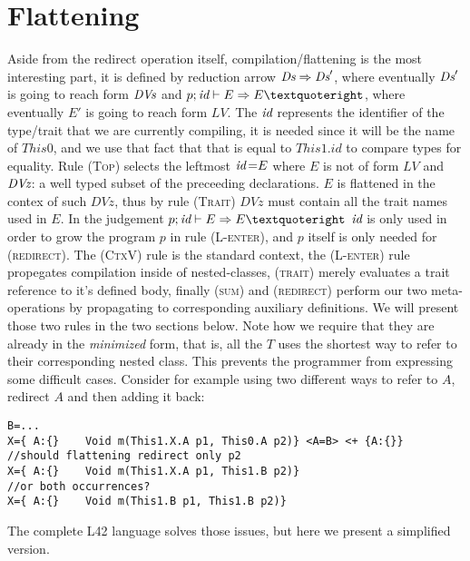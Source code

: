 \section{Flattening}

Aside from the redirect operation itself, compilation/flattening is the most interesting part,
it is defined by reduction arrow $\textit{Ds} \Rightarrow \textit{Ds}'$, where eventually $\textit{Ds}'$ is going to reach form $\textit{DVs}$  and $p; \id \vdash E \Rightarrow E’$, where eventually $E'$ is going to reach form $LV$. The $\textit{id}$ represents the identifier of the type/trait that we are currently compiling, it is needed since it will be the name of $This0$, and we use that fact that that is equal to $This1.id$ to compare types for equality.
Rule \textsc{(Top)}  selects the leftmost $\id\eq{E}$
where $E$ is not of form $LV$ and $\textit{DVz}$: a 
well typed subset of the preceeding declarations. 
$E$ is flattened in the contex of such $DVz$, thus
by rule \textsc{(Trait)} $DVz$ must contain all the trait names used in $E$.
In the judgement $p; \id \vdash E \Rightarrow E’$
$\textit{id}$ is only used in order to grow the program $p$ in rule 
\textsc{(L-enter)}, and $p$ itself is only needed for 
\textsc{(redirect)}.
The \textsc{(CtxV)} rule is the standard context, the \textsc{(L-enter)} rule propegates compilation inside of nested-classes, \textsc{(trait)} merely evaluates a trait reference to it’s defined body,
finally \textsc{(sum)} and \textsc{(redirect)} perform our two meta-operations by propagating to 
corresponding auxiliary definitions. We will present those two rules in the two sections below.
Note how we require that they are already in the \emph{minimized}
form, that is, all the $T$ uses the shortest way to refer to their corresponding nested class. 
This prevents the programmer from expressing some difficult cases. Consider for example using two different ways to refer to $A$, redirect $A$ and then adding it back:
\begin{lstlisting}
B=...
X={ A:{}    Void m(This1.X.A p1, This0.A p2)} <A=B> <+ {A:{}}
//should flattening redirect only p2
X={ A:{}    Void m(This1.X.A p1, This1.B p2)}
//or both occurrences?
X={ A:{}    Void m(This1.B p1, This1.B p2)}
\end{lstlisting}
The complete L42 language solves those issues, but here we present a simplified version.
